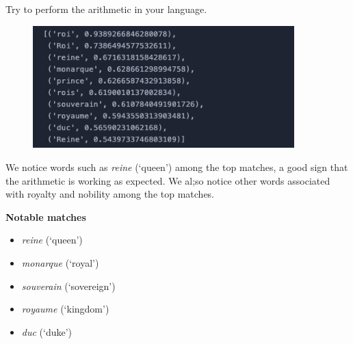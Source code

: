 \newpage
\begin{problem}
  Try to perform the arithmetic 
  in your language.

  \begin{figure}[H]
    \centering
    \begin{minipage}[b]{0.8\textwidth}
      \centering
      \includegraphics[width=0.9\textwidth]{figures/3-arithmetic.png}
      \caption{}
      \label{fig:word-arithmetic}
    \end{minipage}
  \end{figure}

  \begin{answer}
    We notice words such as \emph{reine} (`queen')
    among the top matches, a good sign that the arithmetic is working
    as expected. We al;so notice other words associated with royalty
    and nobility among the top matches.

    \textbf{Notable matches}
    \begin{itemize}
      \item \emph{reine} (`queen')
      \item \emph{monarque} (`royal')
      \item \emph{souverain} (`sovereign')
      \item \emph{royaume} (`kingdom')
      \item \emph{duc} (`duke')
    \end{itemize}
  \end{answer}
\end{problem}

